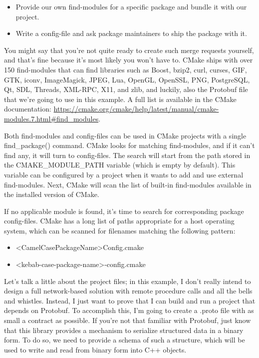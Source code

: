 \begin{itemize}
\item 
Provide our own find-modules for a specific package and bundle it with our project.

\item 
Write a config-file and ask package maintainers to ship the package with it.
\end{itemize}

You might say that you're not quite ready to create such merge requests yourself, and that's fine because it's most likely you won't have to. CMake ships with over 150 find-modules that can find libraries such as Boost, bzip2, curl, curses, GIF, GTK, iconv, ImageMagick, JPEG, Lua, OpenGL, OpenSSL, PNG, PostgreSQL, Qt, SDL, Threads, XML-RPC, X11, and zlib, and luckily, also the Protobuf file that we're going to use in this example. A full list is available in the CMake documentation: \url{https://cmake.org/cmake/help/latest/manual/cmake-modules.7.html\#find_modules}.

Both find-modules and config-files can be used in CMake projects with a single find\_package() command. CMake looks for matching find-modules, and if it can't find any, it will turn to config-files. The search will start from the path stored in the CMAKE\_MODULE\_PATH variable (which is empty by default). This variable can be configured by a project when it wants to add and use external find-modules. Next, CMake will scan the list of built-in find-modules available in the installed version of CMake.

If no applicable module is found, it's time to search for corresponding package config-files. CMake has a long list of paths appropriate for a host operating system, which can be scanned for filenames matching the following pattern:

\begin{itemize}
\item 
<CamelCasePackageName>Config.cmake

\item 
<kebab-case-package-name>-config.cmake
\end{itemize}

Let's talk a little about the project files; in this example, I don't really intend to design a full network-based solution with remote procedure calls and all the bells and whistles. Instead, I just want to prove that I can build and run a project that depends on Protobuf. To accomplish this, I'm going to create a .proto file with as small a contract as possible. If you're not that familiar with Protobuf, just know that this library provides a mechanism to serialize structured data in a binary form. To do so, we need to provide a schema of such a structure, which will be used to write and read from binary form into C++ objects.

